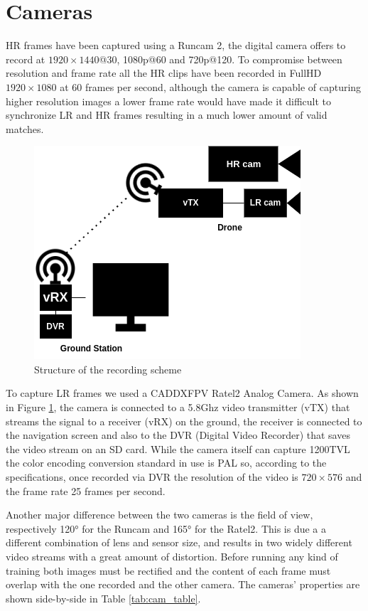 \section{Cameras}
\label{sec:cameras}

HR frames have been captured using a Runcam 2\cite{runcam}, the digital camera offers to record at \(1920\times1440\)@30, 1080p@60 and 720p@120. To compromise between resolution and frame rate all the HR clips have been recorded in FullHD  \(1920\times1080\) at 60 frames per second, although the camera is capable of capturing higher resolution images a lower frame rate would have made it difficult to synchronize LR and HR frames resulting in a much lower amount of valid matches.
\begin{figure}[H]
  \centering
  \includegraphics[scale=0.5]{figures/recording_schematics_2.png}
  \caption{Structure of the recording scheme}
  \label{img:recordin_schematics}
\end{figure}
To capture LR frames we used a CADDXFPV Ratel2 Analog Camera\cite{caddx}. As shown in Figure \ref{img:recordin_schematics}, the camera is connected to a 5.8Ghz video transmitter (vTX) that streams the signal to a receiver (vRX) on the ground, the receiver is connected to the navigation screen and also to the DVR (Digital Video Recorder) that saves the video stream on an SD card. While the camera itself can capture 1200TVL the color encoding conversion standard in use is PAL\cite{pal} so, according to the specifications, once recorded via DVR the resolution of the video is  \(720\times576\) and the frame rate 25 frames per second.

Another major difference between the two cameras is the field of view, respectively 120° for the Runcam and 165° for the Ratel2. This is due a a different combination of lens and sensor size, and results in two widely different video streams with a great amount of distortion. Before running any kind of training both images must be rectified and the content of each frame must overlap with the one recorded and the other camera. The cameras' properties are shown side-by-side in Table \ref{tab:cam_table}.






